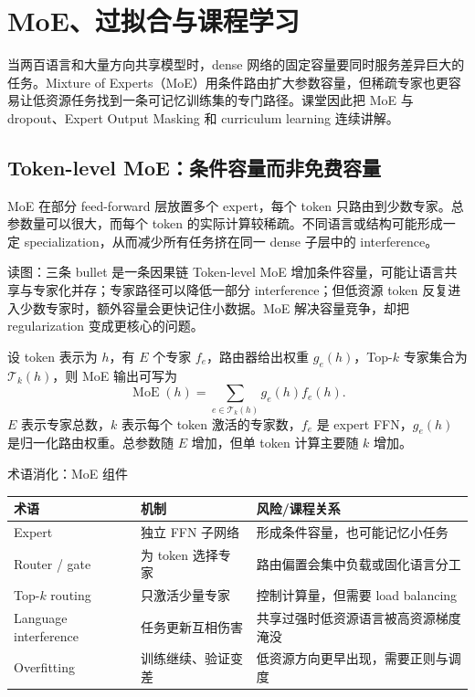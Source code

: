 \section{MoE、过拟合与课程学习}

当两百语言和大量方向共享模型时，dense 网络的固定容量要同时服务差异巨大的任务。Mixture of Experts（MoE）用条件路由扩大参数容量，但稀疏专家也更容易让低资源任务找到一条可记忆训练集的专门路径。课堂因此把 MoE 与 dropout、Expert Output Masking 和 curriculum learning 连续讲解。

\subsection{Token-level MoE：条件容量而非免费容量}

MoE 在部分 feed-forward 层放置多个 expert，每个 token 只路由到少数专家。总参数量可以很大，而每个 token 的实际计算较稀疏。不同语言或结构可能形成一定 specialization，从而减少所有任务挤在同一 dense 子层中的 interference。


\begin{knowledgebox}{读图：三条 bullet 是一条因果链}
Token-level MoE 增加条件容量，可能让语言共享与专家化并存；专家路径可以降低一部分 interference；但低资源 token 反复进入少数专家时，额外容量会更快记住小数据。MoE 解决容量竞争，却把 regularization 变成更核心的问题。
\end{knowledgebox}

设 token 表示为 $h$，有 $E$ 个专家 $f_e$，路由器给出权重 $g_e(h)$，Top-$k$ 专家集合为 $\mathcal{T}_k(h)$，则 MoE 输出可写为
\[
\operatorname{MoE}(h)=\sum_{e\in\mathcal{T}_k(h)} g_e(h)f_e(h).
\]
$E$ 表示专家总数，$k$ 表示每个 token 激活的专家数，$f_e$ 是 expert FFN，$g_e(h)$ 是归一化路由权重。总参数随 $E$ 增加，但单 token 计算主要随 $k$ 增加。

\begin{knowledgebox}{术语消化：MoE 组件}
\begin{tabularx}{\textwidth}{@{}L{0.21\textwidth}L{0.26\textwidth}X@{}}
\toprule
术语 & 机制 & 风险/课程关系 \\
\midrule
Expert & 独立 FFN 子网络 & 形成条件容量，也可能记忆小任务 \\
Router / gate & 为 token 选择专家 & 路由偏置会集中负载或固化语言分工 \\
Top-$k$ routing & 只激活少量专家 & 控制计算量，但需要 load balancing \\
Language interference & 任务更新互相伤害 & 共享过强时低资源语言被高资源梯度淹没 \\
Overfitting & 训练继续、验证变差 & 低资源方向更早出现，需要正则与调度 \\
\bottomrule
\end{tabularx}
\end{knowledgebox}

